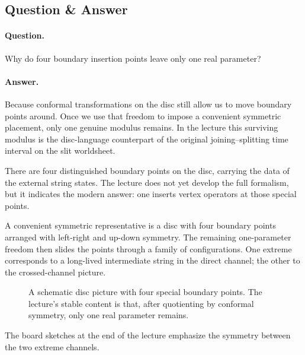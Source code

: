 \subsection{Question \& Answer}

\paragraph{Question.} Why do four boundary insertion points leave only one real parameter?

\paragraph{Answer.} Because conformal transformations on the disc still allow us to move boundary points around. Once we use that freedom to impose a convenient symmetric placement, only one genuine modulus remains. In the lecture this surviving modulus is the disc-language counterpart of the original joining--splitting time interval on the slit worldsheet.

There are four distinguished boundary points on the disc, carrying the data of the external string states. The lecture does not yet develop the full formalism, but it indicates the modern answer: one inserts vertex operators at those special points.

A convenient symmetric representative is a disc with four boundary points arranged with left-right and up-down symmetry. The remaining one-parameter freedom then slides the points through a family of configurations. One extreme corresponds to a long-lived intermediate string in the direct channel; the other to the crossed-channel picture.

\begin{figure}
\centering
{}
\caption{A schematic disc picture with four special boundary points. The lecture's stable content is that, after quotienting by conformal symmetry, only one real parameter remains.}
\end{figure}

The board sketches at the end of the lecture emphasize the symmetry between the two extreme channels.


